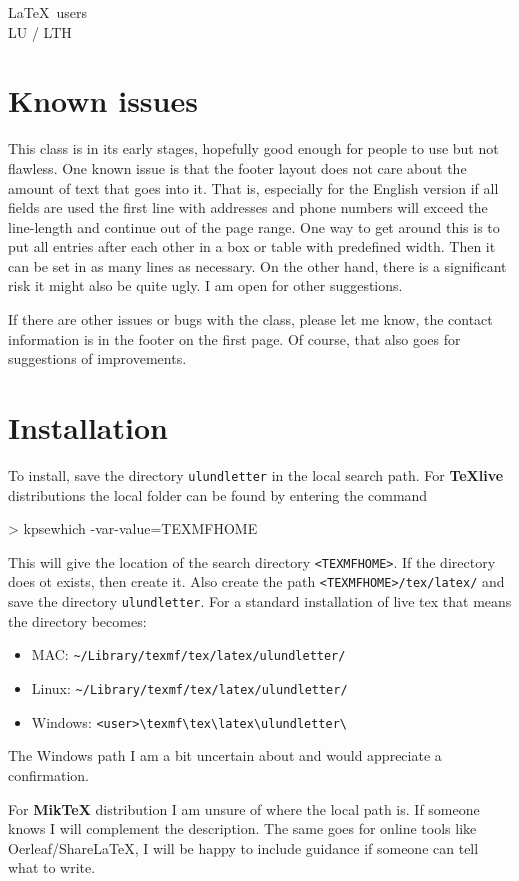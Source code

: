 \documentclass[11pt,eng,LTH,logoBW]{ulundletter}
\begin{document}
\begin{letter}{\LaTeX\ users\\ LU / LTH}
  \section{Known issues}
  This class is in its early stages, hopefully good enough for people to use but not flawless. One known issue is that the footer layout does not care about the amount of text that goes into it. That is, especially for the English version if all fields are used the first line with addresses and phone numbers will exceed the line-length and continue out of the page range. One way to get around this is to put all entries after each other in a box or table with predefined width. Then it can be set in as many lines as necessary. On the other hand, there is a significant risk it might also be quite ugly. I am open for other suggestions.

  If there are other issues or bugs with the class, please let me know, the contact information is in the footer on the first page. Of course, that also goes for suggestions of improvements.

  \section{Installation}
  To install, save the directory \texttt{ulundletter} in the local search path. For \textbf{TeXlive} distributions the local folder can be found by entering the command
  \begin{CodeBox}{}
> kpsewhich -var-value=TEXMFHOME
  \end{CodeBox}
  This will give the location of the search directory \verb|<TEXMFHOME>|. If the directory does ot exists, then create it. Also create the path \verb|<TEXMFHOME>/tex/latex/| and save the directory \texttt{ulundletter}. For a standard installation of live tex that means the directory becomes:
  \begin{itemize}
  \item MAC: \verb|~/Library/texmf/tex/latex/ulundletter/|
  \item Linux: \verb|~/Library/texmf/tex/latex/ulundletter/|
  \item Windows: \verb|<user>\texmf\tex\latex\ulundletter\|
  \end{itemize}
  The Windows path I am a bit uncertain about and would appreciate a confirmation.

  For \textbf{MikTeX} distribution I am unsure of where the local path is. If someone knows I will complement the description. The same goes for online tools like Oerleaf/ShareLaTeX, I will be happy to include guidance if someone can tell what to write.


\end{letter}
\end{document}
